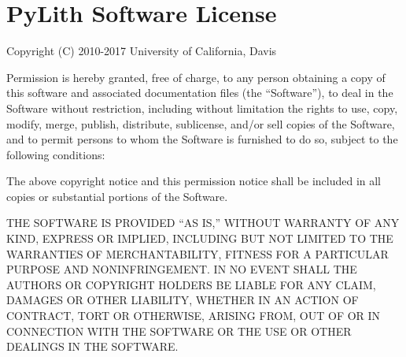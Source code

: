 
\chapter{PyLith Software License}

Copyright (C) 2010-2017 University of California, Davis

Permission is hereby granted, free of charge, to any person obtaining
a copy of this software and associated documentation files (the ``Software''),
to deal in the Software without restriction, including without limitation
the rights to use, copy, modify, merge, publish, distribute, sublicense,
and/or sell copies of the Software, and to permit persons to whom
the Software is furnished to do so, subject to the following conditions:

The above copyright notice and this permission notice shall be included
in all copies or substantial portions of the Software.

THE SOFTWARE IS PROVIDED ``AS IS,'' WITHOUT WARRANTY OF ANY KIND,
EXPRESS OR IMPLIED, INCLUDING BUT NOT LIMITED TO THE WARRANTIES OF
MERCHANTABILITY, FITNESS FOR A PARTICULAR PURPOSE AND NONINFRINGEMENT.
IN NO EVENT SHALL THE AUTHORS OR COPYRIGHT HOLDERS BE LIABLE FOR ANY
CLAIM, DAMAGES OR OTHER LIABILITY, WHETHER IN AN ACTION OF CONTRACT,
TORT OR OTHERWISE, ARISING FROM, OUT OF OR IN CONNECTION WITH THE
SOFTWARE OR THE USE OR OTHER DEALINGS IN THE SOFTWARE. 
